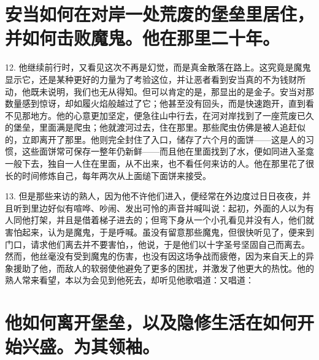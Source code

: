 
\section{安当如何在对岸一处荒废的堡垒里居住，并如何击败魔鬼。他在那里二十年。}

12. 他继续前行时，又看见这次不再是幻觉，而是真金散落在路上。这究竟是魔鬼显示它，还是某种更好的力量为了考验这位，并让恶者看到安当真的不为钱财所动，他既未说明，我们也无从得知。但可以肯定的是，那显出的是金子。安当对那数量感到惊讶，却如履火焰般越过了它；他甚至没有回头，而是快速跑开，直到看不见那地方。他的心意更加坚定，便急往山中行去，在河对岸找到了一座荒废已久的堡垒，里面满是爬虫；他就渡河过去，住在那里。那些爬虫仿佛是被人追赶似的，立即离开了那里。他则完全封住了入口，储存了六个月的面饼——这是人的习惯，这些面饼常可保存一整年仍新鲜——而且他在里面找到了水，便如同进入圣龛一般下去，独自一人住在里面，从不出来，也不看任何来访的人。他在那里花了很长的时间修炼自己，每年两次从上面缒下面饼来接受。\par

13. 但是那些来访的熟人，因为他不许他们进入，便经常在外边度过日日夜夜，并且听到里边好似有喧哗、吵闹、发出可怜的声音并喊叫说：起初，外面的人以为有人同他打架，并且是借着梯子进去的；但弯下身从一个小孔看见并没有人，他们就害怕起来，认为是魔鬼，于是呼喊。虽没有留意那些魔鬼，但很快听见了，便来到门口，请求他们离去并不要害怕，，他说，于是他们以十字圣号坚固自己而离去。然而，他丝毫没有受到魔鬼的伤害，也没有因这场争战而疲倦，因为来自天上的异象援助了他，而敌人的软弱使他避免了更多的困扰，并激发了他更大的热忱。他的熟人常来看望，本以为会见到他死去，却听见他歌唱道：又唱道：\par


\section{他如何离开堡垒，以及隐修生活在如何开始兴盛。为其领袖。}


